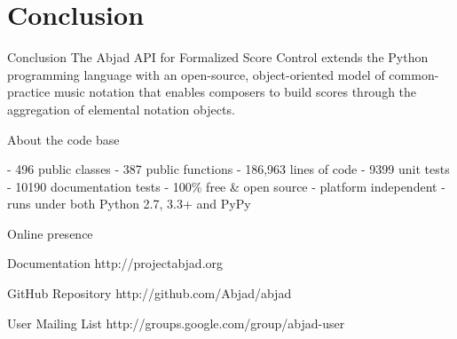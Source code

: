 \section{Conclusion}

\begin{frame}{Conclusion}
The Abjad API for Formalized Score Control extends the Python programming
language with an open-source, object-oriented model of common-practice music
notation that enables composers to build scores through the aggregation of
elemental notation objects.
\end{frame}

\begin{frame}[fragile]{About the code base}
\begin{markdown}
- 496 public classes
- 387 public functions
- 186,963 lines of code
- 9399 unit tests
- 10190 documentation tests
- 100\% free \& open source
- platform independent
- runs under both Python 2.7, 3.3+ and PyPy
\end{markdown}
\end{frame}

\begin{frame}{Online presence}
    \begin{block}{Documentation}
        http://projectabjad.org
    \end{block}
    \begin{block}{GitHub Repository}
        http://github.com/Abjad/abjad
    \end{block}
    \begin{block}{User Mailing List}
        http://groups.google.com/group/abjad-user
    \end{block}
\end{frame}


